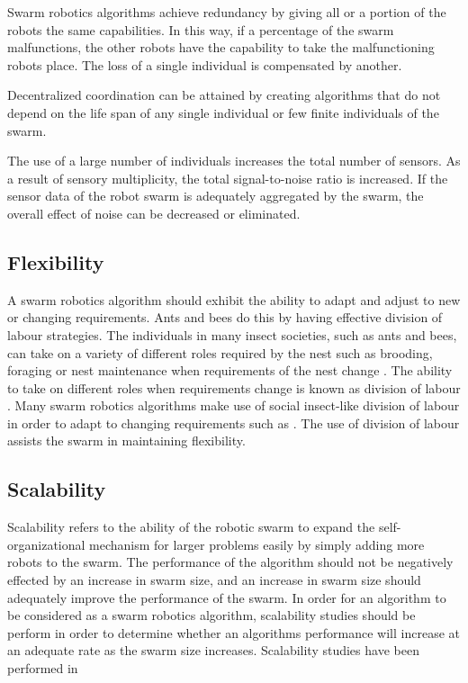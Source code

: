 Swarm robotics algorithms achieve redundancy by giving all or a portion of the robots the same capabilities. In this way, if a percentage of the swarm malfunctions, the other robots have the capability to take the malfunctioning robots place. The loss of a single individual is compensated by another.

Decentralized coordination can be attained by creating algorithms that do not depend on the life span of any single individual or few finite individuals of the swarm.

The use of a large number of individuals increases the total number of sensors.  As a result of sensory multiplicity, the total signal-to-noise ratio is increased. If the sensor data of the robot swarm is adequately aggregated by the swarm, the overall effect of noise can be decreased or eliminated. 

\subsection{Flexibility}

A swarm robotics algorithm should exhibit the ability to adapt and adjust to new or changing requirements. Ants and bees do this by having effective division of labour strategies. The individuals in many insect societies, such as ants and bees, can take on a variety of different roles required by the nest such as brooding, foraging or nest maintenance when requirements of the nest change \cite{morley1946division}. The ability to take on different roles when requirements change is known as division of labour \cite{beshers2001models}. Many swarm robotics algorithms make use of social insect-like division of labour in order to adapt to changing requirements such as \cite{labella2006division, liu2007towards, gerkey2004formal}. The use of division of labour assists the swarm in maintaining flexibility.

\subsection{Scalability}
Scalability refers to the ability of the robotic swarm to expand the self-organizational mechanism for larger problems easily by simply adding more robots to the swarm. The performance of the algorithm should not be negatively effected by an increase in swarm size, and an increase in swarm size should adequately improve the performance of the swarm. In order for an algorithm to be considered as a swarm robotics algorithm, scalability studies should be perform in order to determine whether an algorithms performance will increase at an adequate rate as the swarm size increases. Scalability studies have been performed in \cite{nouyan2008path,bahgecci2005evolving,zarzhitsky2005distributed}

